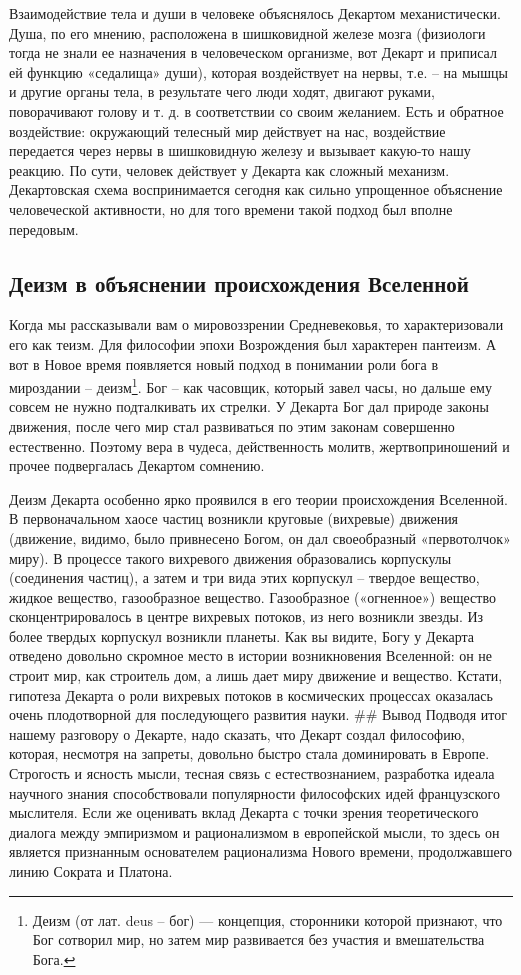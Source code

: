 \documentclass[a4paper, 14pt]{extreport}
\begin{document}
Взаимодействие тела и души в человеке объяснялось Декартом
механистически. Душа, по его мнению, расположена в шишковидной железе
мозга (физиологи тогда не знали ее назначения в человеческом организме,
вот Декарт и приписал ей функцию «седалища» души), которая воздействует
на нервы, т.е. -- на мышцы и другие органы тела, в результате чего люди
ходят, двигают руками, поворачивают голову и т. д. в соответствии со
своим желанием. Есть и обратное воздействие: окружающий телесный мир
действует на нас, воздействие передается через нервы в шишковидную
железу и вызывает какую-то нашу реакцию. По сути, человек действует у
Декарта как сложный механизм. Декартовская схема воспринимается сегодня
как сильно упрощенное объяснение человеческой активности, но для того
времени такой подход был вполне передовым.

\subsection{Деизм в объяснении происхождения Вселенной}

Когда мы рассказывали вам о мировоззрении Средневековья, то
характеризовали его как теизм. Для философии эпохи Возрождения был
характерен пантеизм. А вот в Новое время появляется новый подход в
понимании роли бога в мироздании -- деизм\footnote{Деизм (от лат. deus
  -- бог) --- концепция, сторонники которой признают, что Бог сотворил
  мир, но затем мир развивается без участия и вмешательства Бога.}. Бог
-- как часовщик, который завел часы, но дальше ему совсем не нужно
подталкивать их стрелки. У Декарта Бог дал природе законы движения,
после чего мир стал развиваться по этим законам совершенно естественно.
Поэтому вера в чудеса, действенность молитв, жертвоприношений и прочее
подвергалась Декартом сомнению.

Деизм Декарта особенно ярко проявился в его теории происхождения
Вселенной. В первоначальном хаосе частиц возникли круговые (вихревые)
движения (движение, видимо, было привнесено Богом, он дал своеобразный
«первотолчок» миру). В процессе такого вихревого движения образовались
корпускулы (соединения частиц), а затем и три вида этих корпускул --
твердое вещество, жидкое вещество, газообразное вещество. Газообразное
(«огненное») вещество сконцентрировалось в центре вихревых потоков, из
него возникли звезды. Из более твердых корпускул возникли планеты. Как
вы видите, Богу у Декарта отведено довольно скромное место в истории
возникновения Вселенной: он не строит мир, как строитель дом, а лишь
дает миру движение и вещество. Кстати, гипотеза Декарта о роли вихревых
потоков в космических процессах оказалась очень плодотворной для
последующего развития науки. \#\# Вывод Подводя итог нашему разговору о
Декарте, надо сказать, что Декарт создал философию, которая, несмотря на
запреты, довольно быстро стала доминировать в Европе. Строгость и
ясность мысли, тесная связь с естествознанием, разработка идеала
научного знания способствовали популярности философских идей
французского мыслителя. Если же оценивать вклад Декарта с точки зрения
теоретического диалога между эмпиризмом и рационализмом в европейской
мысли, то здесь он является признанным основателем рационализма Нового
времени, продолжавшего линию Сократа и Платона.
\end{document}
